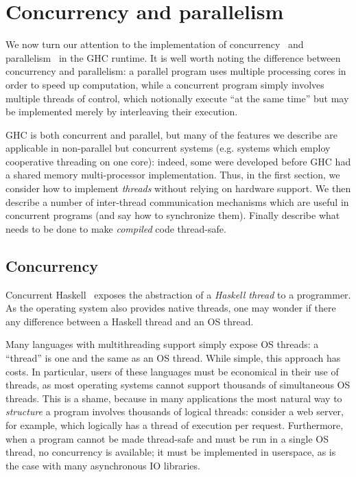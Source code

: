 \section{Concurrency and parallelism}

We now turn our attention to the implementation of
concurrency~\cite{PeytonJones:1996:CH:237721.237794} and
parallelism~\cite{Harris:2005:HSM:1088348.1088354} in the GHC runtime.
It is well worth noting the difference between concurrency and
parallelism: a parallel program uses multiple processing cores in order
to speed up computation, while a concurrent program simply involves
multiple threads of control, which notionally execute ``at the same
time'' but may be implemented merely by interleaving their execution.

GHC is both concurrent and parallel, but many of the features we
describe are applicable in non-parallel but concurrent systems (e.g.
systems which employ cooperative threading on one core): indeed, some
were developed before GHC had a shared memory multi-processor
implementation.  Thus, in the first section, we consider how to
implement \emph{threads} without relying on hardware support.  We then
describe a number of inter-thread communication mechanisms which are
useful in concurrent programs (and say how to synchronize them). Finally
describe what needs to be done to make \emph{compiled} code thread-safe.

\subsection{Concurrency}

Concurrent Haskell~\cite{PeytonJones:1996:CH:237721.237794} exposes the
abstraction of a \emph{Haskell thread} to a programmer. As the
operating system also provides native threads, one may wonder if there
any difference between a Haskell thread and an OS thread.

Many languages with multithreading support simply expose OS threads: a
``thread'' is one and the same as an OS thread.  While simple, this
approach has costs.  In particular, users of these languages must be
economical in their use of threads, as most operating systems cannot
support thousands of simultaneous OS threads.  This is a shame, because
in many applications the most natural way to \emph{structure} a program
involves thousands of logical threads: consider a web server, for
example, which logically has a thread of execution per request.
Furthermore, when a program cannot be made thread-safe and must be run
in a single OS thread, no concurrency is available; it must be
implemented in userspace, as is the case with many asynchronous IO
libraries.

